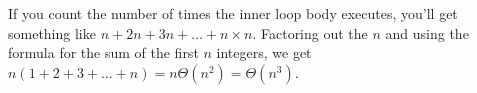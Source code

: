 \begin{prob}
    \timecomplexityinstructions

    \inputminted[lastline=4]{python}{\thisdir/code.py}


    \begin{soln}
        If you count the number of times the inner loop body executes, you'll get something
        like $n + 2n + 3n + \ldots + n\times n$. Factoring out the $n$ and using the
        formula for the sum of the first $n$ integers, we get
        $n (1 + 2 + 3 + \ldots + n) = n \Theta(n^2) = \Theta(n^3)$.
    \end{soln}

\end{prob}
